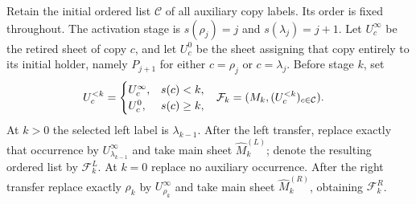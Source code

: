 \begin{definition}
    \label{def:chain_sweep_labelled_history}
    \leanok
    Retain the initial ordered list $\mathcal C$ of all auxiliary copy
    labels. Its order is fixed throughout. The activation stage is
    $s(\rho_j)=j$ and $s(\lambda_j)=j+1$.
    Let $U_c^\infty$ be the retired sheet of copy $c$, and let
    $U_c^0$ be the sheet assigning that copy entirely to its initial
    holder, namely $P_{j+1}$ for either $c=\rho_j$ or $c=\lambda_j$.
    Before stage $k$, set
    \begin{align}
        U_c^{<k}                    & =
        \begin{cases}
            U_c^\infty, & s(c)<k,    \\
            U_c^0,      & s(c)\ge k,
        \end{cases} &
        \mathcal F_k                & =(M_k,(U_c^{<k})_{c\in\mathcal C}).\notag
    \end{align}
    At $k>0$ the selected left label is $\lambda_{k-1}$.
    After the left transfer, replace exactly that occurrence by
    $U_{\lambda_{k-1}}^\infty$ and take main sheet $\widehat M_k^{(L)}$;
    denote the resulting ordered list by $\mathcal F_k^L$.
    At $k=0$ replace no auxiliary occurrence.
    After the right transfer replace exactly $\rho_k$ by $U_{\rho_k}^\infty$
    and take main sheet $\widehat M_k^{(R)}$, obtaining $\mathcal F_k^R$.
\end{definition}


